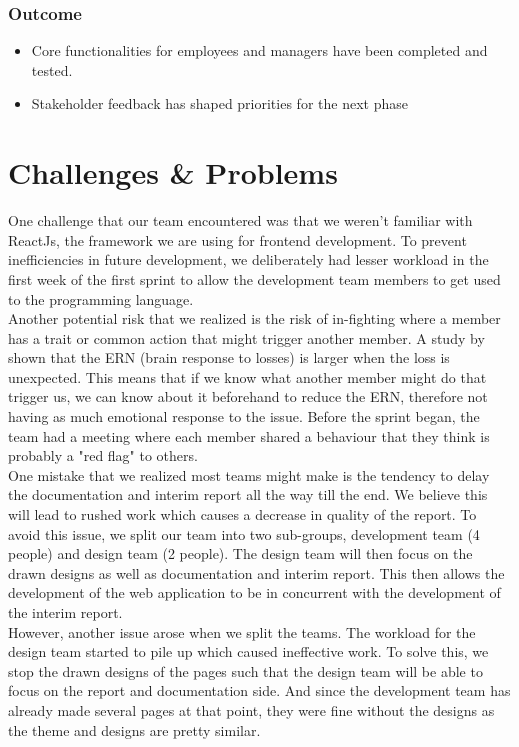 \documentclass[a4paper,12pt, oneside]{report}
\begin{document}
\subsection{Outcome}
\begin{itemize}
    \item Core functionalities for employees and managers have been completed and tested.
    \item Stakeholder feedback has shaped priorities for the next phase
\end{itemize}

\chapter{Challenges \& Problems}
One challenge that our team encountered was that we weren't familiar with ReactJs, the framework we are using for frontend development. To prevent inefficiencies in future development, we deliberately had lesser workload in the first week of the first sprint to allow the development team members to get used to the programming language.\\

Another potential risk that we realized is the risk of in-fighting where a member has a trait or common action that might trigger another member. A study by \citet{HajcakGreg2005Bpaw} shown that the ERN (brain response to losses) is larger when the loss is unexpected. This means that if we know what another member might do that trigger us, we can know about it beforehand to reduce the ERN, therefore not having as much emotional response to the issue. Before the sprint began, the team had a meeting where each member shared a behaviour that they think is probably a "red flag" to others.\\

One mistake that we realized most teams might make is the tendency to delay the documentation and interim report all the way till the end. We believe this will lead to rushed work which causes a decrease in quality of the report. To avoid this issue, we split our team into two sub-groups, development team (4 people) and design team (2 people). The design team will then focus on the drawn designs as well as documentation and interim report. This then allows the development of the web application to be in concurrent with the development of the interim report. \\

However, another issue arose when we split the teams. The workload for the design team started to pile up which caused ineffective work. To solve this, we stop the drawn designs of the pages such that the design team will be able to focus on the report and documentation side. And since the development team has already made several pages at that point, they were fine without the designs as the theme and designs are pretty similar.\\
\end{document}

